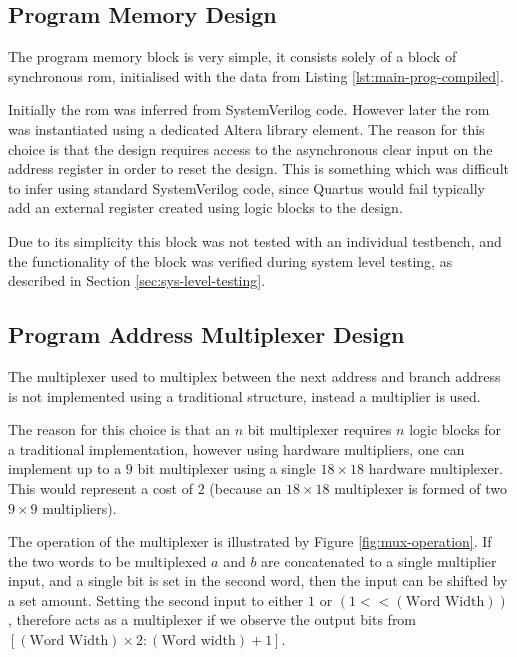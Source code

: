 \subsection{Program Memory Design}
The program memory block is very simple, it consists solely of a block of synchronous \gls{rom}, initialised with the data from Listing \ref{lst:main-prog-compiled}.

Initially the \gls{rom} was inferred from SystemVerilog code. However later the \gls{rom} was instantiated using a dedicated Altera library element. The reason for this choice is that the design requires access to the asynchronous clear input on the address register in order to reset the design. This is something which was difficult to infer using standard SystemVerilog code, since Quartus would fail typically add an external register created using logic blocks to the design.

Due to its simplicity this block was not tested with an individual testbench, and the functionality of the block was verified during system level testing, as described in Section \ref{sec:sys-level-testing}.

\subsection{Program Address Multiplexer Design} \label{sec:mux-design}
The multiplexer used to multiplex between the next address and branch address is not implemented using a traditional structure, instead a multiplier is used.

The reason for this choice is that an $n$ bit multiplexer requires $n$ logic blocks for a traditional implementation, however using hardware multipliers, one can implement up to a $9$ bit multiplexer using a single $18 \times 18$ hardware multiplexer. This would represent a cost of $2$ (because an $18 \times 18$ multiplexer is formed of two $9\times9$ multipliers).

The operation of the multiplexer is illustrated by Figure \ref{fig:mux-operation}. If the two words to be multiplexed $a$ and $b$ are concatenated to a single multiplier input, and a single bit is set in the second word, then the input can be shifted by a set amount. Setting the second input to either $1$ or $(1 << (\text{Word Width}))$, therefore acts as a multiplexer if we observe the output bits from $[(\text{Word Width}) \times 2: (\text{Word width}) + 1]$.

